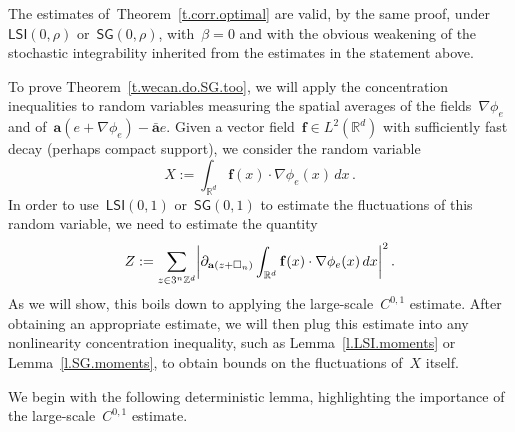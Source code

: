 \documentclass[11pt,twoside]{article} %
\let\oldsquare\square %
\renewcommand{\square}{\oldsquare}
\numberwithin{equation}{section}
\theoremstyle{definition}
\let\originalleft\left
\let\originalright\right
\renewcommand{\left}{\mathopen{}\mathclose\bgroup\originalleft}
\renewcommand{\right}{\aftergroup\egroup\originalright}
\newcommand*{\Zd}{\ensuremath{\mathbb{Z}^d}}
\newcommand*{\Rd}{\ensuremath{\mathbb{R}^d}}
\newcommand{\f}{\mathbf{f}}
\renewcommand{\a}{\mathbf{a}}
\newcommand{\ahom}{\bar{\a}}
\newcommand{\cu}{\square}
\newcommand{\LSI}{\mathsf{LSI}}
\newcommand{\SG}{\mathsf{SG}}
\begin{document}
The estimates of~Theorem~\ref{t.corr.optimal} are valid, by the same proof, under~$\LSI(0,\rho)$ or~$\SG(0,\rho)$, with~$\beta = 0$ and with the obvious weakening of the stochastic integrability inherited from the estimates in the statement above. 

\smallskip

To prove Theorem~\ref{t.wecan.do.SG.too}, 
we will apply the concentration inequalities to 
random variables measuring the spatial averages of the fields~$\nabla \phi_e$ and of~$\a(e+\nabla \phi_e) - \ahom e$. Given a vector field~$\f\in L^2(\Rd)$ with sufficiently fast decay (perhaps compact support), we consider the random variable 
\begin{equation}
\label{e.rvX}
X:=
\int_{\Rd} \f(x)\cdot \nabla \phi_e(x)\,dx
\,.
\end{equation}
In order to use~$\LSI(0,1)$ or~$\SG(0,1)$ to estimate the fluctuations of this random variable, we need to estimate the quantity 
\begin{equation}
\label{e.Zderv}
Z := \sum_{z\in 3^n\Zd} \left|  \partial_{\a(z+\cu_n)} \int_{\Rd} \f(x)\cdot \nabla \phi_e(x)\,dx
\right|^2
\,.
\end{equation}
As we will show, this boils down to applying the large-scale~$C^{0,1}$ estimate. After obtaining an appropriate estimate, we will then plug this estimate into any nonlinearity concentration inequality, such as Lemma~\ref{l.LSI.moments} or Lemma~\ref{l.SG.moments}, to obtain bounds on the fluctuations of~$X$ itself. 

\smallskip

We begin with the following deterministic lemma, highlighting the importance of the large-scale~$C^{0,1}$ estimate. 
\end{document}
